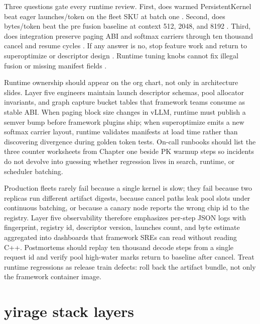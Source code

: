 Three questions gate every runtime review. First, does warmed PersistentKernel beat eager launches/token on the fleet SKU at batch one \citep{taxbreak2026,yirage2026,patel2025llminference,dlbook}. Second, does bytes/token beat the pre fusion baseline at context 512, 2048, and 8192 \citep{memoryfloor2026,patel2025llminference,yirage2026,chen2020compilerbasedhardw,dlbook}. Third, does integration preserve paging ABI and softmax carriers through ten thousand cancel and resume cycles \citep{kwon2023vllm,dao2022flashattention,yirage2026,chen2020compilerbasedhardw,patel2025llminference,dlbook}. If any answer is no, stop feature work and return to superoptimize or descriptor design \citep{yirage2026,chen2020compilerbasedhardw,patel2025llminference,dlbook}. Runtime tuning knobs cannot fix illegal fusion or missing manifest fields \citep{yirage2026,chen2020compilerbasedhardw,patel2025llminference,taxbreak2026,memoryfloor2026,dlbook}.

Runtime ownership should appear on the org chart, not only in architecture slides. Layer five engineers maintain launch descriptor schemas, pool allocator invariants, and graph capture bucket tables that framework teams consume as stable ABI. When paging block size changes in vLLM, runtime must publish a semver bump before framework plugins ship; when superoptimize emits a new softmax carrier layout, runtime validates manifests at load time rather than discovering divergence during golden token tests. On-call runbooks should list the three counter worksheets from Chapter one beside PK warmup steps so incidents do not devolve into guessing whether regression lives in search, runtime, or scheduler batching.

Production fleets rarely fail because a single kernel is slow; they fail because two replicas run different artifact digests, because cancel paths leak pool slots under continuous batching, or because a canary node reports the wrong chip id to the registry. Layer five observability therefore emphasizes per-step JSON logs with fingerprint, registry id, descriptor version, launches count, and byte estimate aggregated into dashboards that framework SREs can read without reading C++. Postmortems should replay ten thousand decode steps from a single request id and verify pool high-water marks return to baseline after cancel. Treat runtime regressions as release train defects: roll back the artifact bundle, not only the framework container image.

\section{yirage stack layers}
\label{sec:ch29_yirage_stack_layers}

